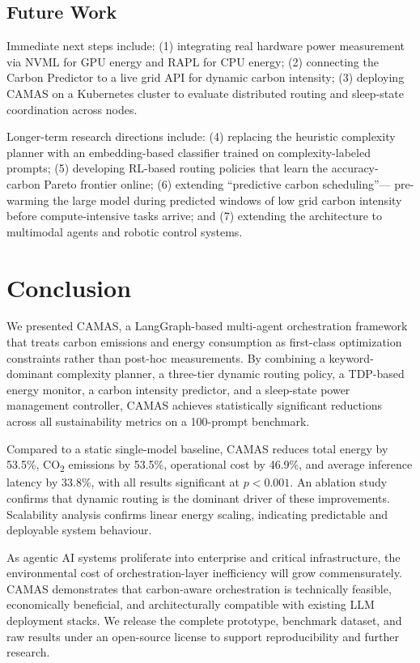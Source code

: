 \documentclass[journal]{IEEEtran}
\begin{document}
\subsection{Future Work}

Immediate next steps include: (1) integrating real hardware power measurement
via NVML for GPU energy and RAPL for CPU energy; (2) connecting the Carbon
Predictor to a live grid API for dynamic carbon intensity; (3) deploying CAMAS
on a Kubernetes cluster to evaluate distributed routing and sleep-state
coordination across nodes.

Longer-term research directions include: (4) replacing the heuristic complexity
planner with an embedding-based classifier trained on complexity-labeled
prompts; (5) developing RL-based routing policies that learn the accuracy-
carbon Pareto frontier online; (6) extending ``predictive carbon scheduling''—
pre-warming the large model during predicted windows of low grid carbon
intensity before compute-intensive tasks arrive; and (7) extending the
architecture to multimodal agents and robotic control systems.

\section{Conclusion}

We presented CAMAS, a LangGraph-based multi-agent orchestration framework that
treats carbon emissions and energy consumption as first-class optimization
constraints rather than post-hoc measurements. By combining a keyword-dominant
complexity planner, a three-tier dynamic routing policy, a TDP-based energy
monitor, a carbon intensity predictor, and a sleep-state power management
controller, CAMAS achieves statistically significant reductions across all
sustainability metrics on a 100-prompt benchmark.

Compared to a static single-model baseline, CAMAS reduces total energy by
53.5\%, CO\textsubscript{2} emissions by 53.5\%, operational cost by 46.9\%,
and average inference latency by 33.8\%, with all results significant at
$p < 0.001$. An ablation study confirms that dynamic routing is the dominant
driver of these improvements. Scalability analysis confirms linear energy
scaling, indicating predictable and deployable system behaviour.

As agentic AI systems proliferate into enterprise and critical infrastructure,
the environmental cost of orchestration-layer inefficiency will grow
commensurately. CAMAS demonstrates that carbon-aware orchestration is
technically feasible, economically beneficial, and architecturally compatible
with existing LLM deployment stacks. We release the complete prototype,
benchmark dataset, and raw results under an open-source license to support
reproducibility and further research.
\end{document}
